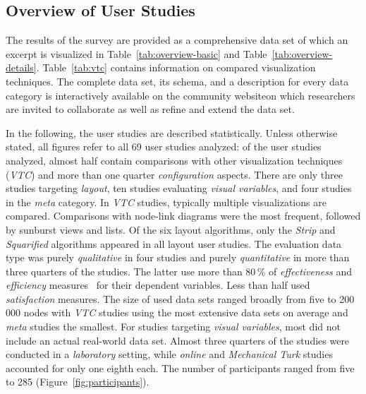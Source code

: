 \documentclass[sigconf,
natbib=true]{acmart}
\begin{document}
\subsection{Overview of User Studies} %
\label{sec:summary:overview}
The results of the survey are provided as a comprehensive data set of which an excerpt is visualized in Table~\ref{tab:overview-basic} and Table~\ref{tab:overview-details}.
Table~\ref{tab:vtc} contains information on compared visualization techniques.
The complete data set, its schema, and a description for every data category is interactively available on the community website\footnotemark[1] on which researchers are invited to collaborate as well as refine and extend the data set.

In the following, the user studies are described statistically.
Unless otherwise stated, all figures refer to all 69 user studies analyzed:
of the user studies analyzed, almost half contain comparisons with other visualization techniques (\emph{VTC}) and more than one quarter \emph{configuration} aspects.
There are only three studies targeting \emph{layout}, ten studies evaluating \emph{visual variables}, and four studies in the \emph{meta} category.
In \emph{VTC} studies, typically multiple visualizations are compared.
Comparisons with node-link diagrams were the most frequent, followed by sunburst views and lists.
Of the six layout algorithms, only the \emph{Strip} and \emph{Squarified} algorithms appeared in all layout user studies.
The evaluation data type was purely \emph{qualitative} in four studies and purely \emph{quantitative} in more than three quarters of the studies.
The latter use more than 80\,\% of \emph{effectiveness} and \emph{efficiency} measures~\cite{leroy2011-designing} for their dependent variables.
Less than half used \emph{satisfaction} measures.
The size of used data sets ranged broadly from five to 200\,000 nodes with \emph{VTC} studies using the most extensive data sets on average and \emph{meta} studies the smallest.
For studies targeting \emph{visual variables}, most did not include an actual real-world data set.
Almost three quarters of the studies were conducted in a \emph{laboratory} setting, while \emph{online} and \emph{Mechanical Turk} studies accounted for only one eighth each.
The number of participants ranged from five to 285 (Figure~\ref{fig:participants}). %
\end{document}
